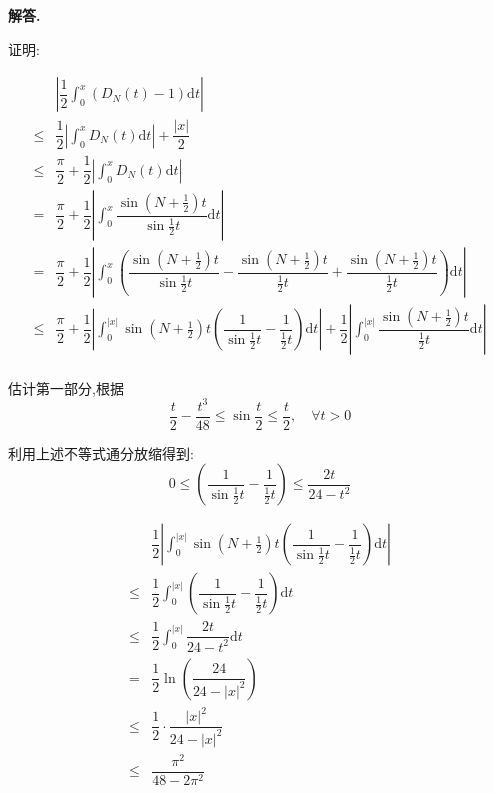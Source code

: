 \documentclass[12pt, a4paper, oneside]{ctexart}
\newenvironment{solution}{\par\noindent\textbf{解答. }}{\par}
\begin{document}
\begin{solution}
\par
证明:
\par
$$
\begin{aligned}
    &\left|\dfrac{1}{2}\int_{0}^{x}(D_N(t)-1)\mathrm{d}t\right|\\
    \leqslant & \dfrac{1}{2}\left|\int_{0}^{x}D_N(t)\mathrm{d}t\right|
    +\dfrac{|x|}{2}\\
    \leqslant & \dfrac{\pi}{2}+\dfrac{1}{2}\left|\int_{0}^{x}D_N(t)\mathrm{d}t\right|\\
    = &\dfrac{\pi}{2}+\dfrac{1}{2}\left|\int_{0}^{x}\dfrac{\sin (N+\frac{1}{2})t}{\sin \frac{1}{2}t}\mathrm{d}t\right|\\
    =&\dfrac{\pi}{2}+\dfrac{1}{2}\left|\int_{0}^{x}\left(
        \dfrac{\sin (N+\frac{1}{2})t}{\sin \frac{1}{2}t}
    -\dfrac{\sin (N+\frac{1}{2})t}{\frac{1}{2}t}+
    \dfrac{\sin (N+\frac{1}{2})t}{\frac{1}{2}t}\right)\mathrm{d}t\right|\\
    \leqslant &   \dfrac{\pi}{2}+\dfrac{1}{2}\left|\int_{0}^{|x|}
        \sin \left(N+\frac{1}{2}\right)t\left( \dfrac{1}{\sin \frac{1}{2}t}
    -\dfrac{1}{\frac{1}{2}t}\right)\mathrm{d}t\right|
    +\dfrac{1}{2}\left| \int_{0}^{|x|}
    \dfrac{\sin (N+\frac{1}{2})t}{\frac{1}{2}t}\mathrm{d}t\right|\\
\end{aligned}
$$
\par
估计第一部分,根据
$$
\dfrac{t}{2}-\dfrac{t^3}{48}\leqslant \sin \frac{t}{2}\leqslant \dfrac{t}{2}, \quad \forall t>0
$$
\par
利用上述不等式通分放缩得到:
$$
0\leqslant \left( \dfrac{1}{\sin \frac{1}{2}t}
-\dfrac{1}{\frac{1}{2}t}\right) \leqslant \dfrac{2t}{24-t^2}
$$
\par
$$
\begin{aligned}
&\dfrac{1}{2}\left|\int_{0}^{|x|}
\sin \left(N+\frac{1}{2}\right)t\left( \dfrac{1}{\sin \frac{1}{2}t}
-\dfrac{1}{\frac{1}{2}t}\right)\mathrm{d}t\right|\\
\leqslant & \dfrac{1}{2}\int_{0}^{|x|} \left( \dfrac{1}{\sin \frac{1}{2}t}
-\dfrac{1}{\frac{1}{2}t}\right) \mathrm{d}t\\
\leqslant & \dfrac{1}{2}\int_{0}^{|x|}\dfrac{2t}{24-t^2} \mathrm{d}t\\
=& \dfrac{1}{2}\ln\left(\dfrac{24}{24-|x|^2}\right)\\
\leqslant & \dfrac{1}{2}\cdot \dfrac{|x|^2}{24-|x|^2}\\
\leqslant & \dfrac{\pi^2}{48-2\pi^2}
\end{aligned}
$$
\end{solution}
\end{document}
